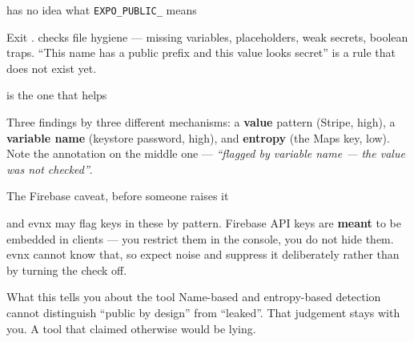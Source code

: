 \documentclass[aspectratio=169,10pt]{beamer}
\begin{document}
\begin{frame}[fragile]{ has no idea what \texttt{EXPO\_PUBLIC\_} means}

  \vspace{0.4em}
  {\footnotesize Exit \exitzero.  checks file hygiene --- missing
  variables, placeholders, weak secrets, boolean traps. ``This name has a
  public prefix and this value looks secret'' is a rule that does not exist
  yet.}
\end{frame}

\begin{frame}[fragile]{ is the one that helps}

  \vspace{0.3em}
  {\footnotesize Three findings by three different mechanisms: a \textbf{value}
  pattern (Stripe, high), a \textbf{variable name} (keystore password, high),
  and \textbf{entropy} (the Maps key, low). Note the annotation on the middle
  one --- \emph{``flagged by variable name --- the value was not checked''}.}
\end{frame}

\begin{frame}{The Firebase caveat, before someone raises it}
  \begin{block}{ and }
    evnx may flag keys in these by pattern. Firebase API keys are
    \textbf{meant} to be embedded in clients --- you restrict them in the
    console, you do not hide them. evnx cannot know that, so expect noise and
    suppress it deliberately rather than by turning the check off.
  \end{block}

  \vspace{0.9em}
  \begin{block}{What this tells you about the tool}
    Name-based and entropy-based detection cannot distinguish ``public by
    design'' from ``leaked''. That judgement stays with you. A tool that
    claimed otherwise would be lying.
  \end{block}
\end{frame}
\end{document}
